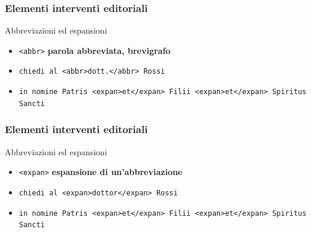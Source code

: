\begin{frame}
    \frametitle{Elementi interventi editoriali}
    \addtocounter{nframe}{1}
    

    \begin{block}{Abbreviazioni ed espansioni}
        \begin{itemize}
            \item \texttt{<abbr>} \textbf{parola abbreviata, brevigrafo}
            \item[] \texttt{chiedi al <abbr>dott.</abbr> Rossi}
            \item[] \texttt{in nomine Patris <expan>et</expan> Filii
            <expan>et</expan> Spiritus Sancti}
        \end{itemize}
        
    \end{block}
    
\end{frame}

\begin{frame}
    \frametitle{Elementi interventi editoriali}
    \addtocounter{nframe}{1}
    

    \begin{block}{Abbreviazioni ed espansioni}
        \begin{itemize}
            \item \texttt{<expan>} \textbf{espansione di un’abbreviazione}
            \item[] \texttt{chiedi al <expan>dottor</expan> Rossi}
            \item[] \texttt{in nomine Patris <expan>et</expan> Filii <expan>et</expan> Spiritus Sancti}
        \end{itemize}
        
    \end{block}
    
\end{frame}


